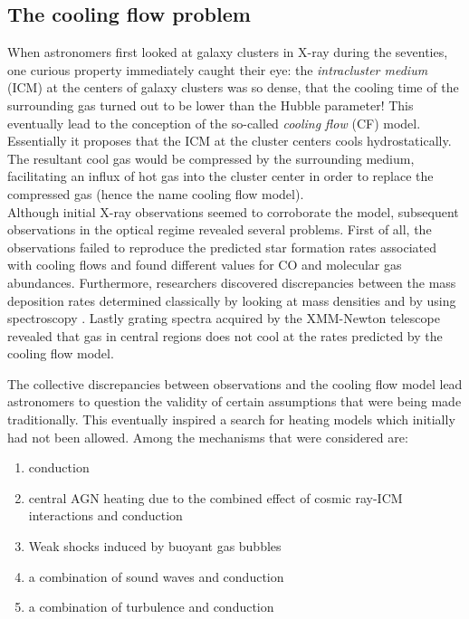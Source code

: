 \documentclass[a4paper]{article}
\begin{document}
    \subsection{The cooling flow problem}
        
        When astronomers first looked at galaxy clusters in X-ray during the seventies, one curious property immediately caught their eye: the \textit{intracluster medium} (ICM) at the centers of galaxy clusters was so dense, that the cooling time of the surrounding gas turned out to be lower than the Hubble parameter! This eventually lead to the conception of the so-called \textit{cooling flow} (CF) model. Essentially it proposes that the ICM at the cluster centers cools hydrostatically. The resultant cool gas would be compressed by the surrounding medium, facilitating an influx of hot gas into the cluster center in order to replace the compressed gas (hence the name cooling flow model). \\
        Although initial X-ray observations seemed to corroborate the model, subsequent observations in the optical regime revealed several problems. First of all, the observations failed to reproduce the predicted star formation rates associated with cooling flows and found different values for CO and molecular gas abundances. Furthermore, researchers discovered discrepancies between the mass deposition rates determined classically by looking at mass densities and by using spectroscopy \citep{Makishima2001}. Lastly grating spectra acquired by the XMM-Newton telescope revealed that gas in central regions does not cool at the rates predicted by the cooling flow model. \\
        
        \par The collective discrepancies between observations and the cooling flow model lead astronomers to question the validity of certain assumptions that were being made traditionally. This eventually inspired a search for heating models which initially had not been allowed. Among the mechanisms that were considered are:
        
        \begin{enumerate}
            \item conduction 
            \item central AGN heating due to the combined effect of cosmic ray-ICM interactions and conduction 
            \item Weak shocks induced by buoyant gas bubbles 
            \item a combination of sound waves and conduction
            \item a combination of turbulence and conduction
        \end{enumerate}
        
\end{document}
